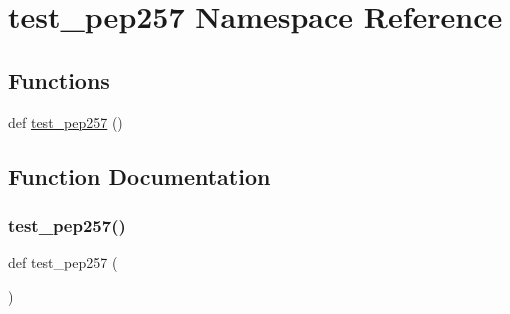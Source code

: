\hypertarget{namespacetest__pep257}{}\section{test\+\_\+pep257 Namespace Reference}
\label{namespacetest__pep257}
\subsection*{Functions}
\begin{DoxyCompactItemize}
\item 
def \mbox{\hyperlink{namespacetest__pep257_a559935a3d212bee5909da8359f3df0b1}{test\+\_\+pep257}} ()
\end{DoxyCompactItemize}


\subsection{Function Documentation}
\mbox{\label{namespacetest__pep257_a559935a3d212bee5909da8359f3df0b1}} 
\subsubsection{\texorpdfstring{test\+\_\+pep257()}{test\_pep257()}}
{\footnotesize\ttfamily def test\+\_\+pep257 (\begin{DoxyParamCaption}{ }\end{DoxyParamCaption})}

